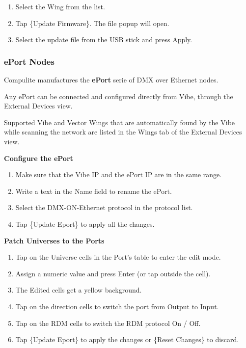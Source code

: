 \documentclass[
]{article}
\begin{document}
\begin{enumerate}
\def\labelenumi{\arabic{enumi}.}
\item
  Select the Wing from the list.
\item
  Tap \{Update Firmware\}. The file popup will open.
\item
  Select the update file from the USB stick and press Apply.
\end{enumerate}

\hypertarget{eport-nodes}{%
\subsubsection{ePort Nodes}\label{eport-nodes}}

Compulite manufactures the \textbf{ePort} serie of DMX over Ethernet nodes.

Any ePort can be connected and configured directly from Vibe, through the External Devices view.

Supported Vibe and Vector Wings that are automatically found by the Vibe while scanning the network are listed in the Wings tab of the External Devices view.

\textbf{Configure the ePort}

\begin{enumerate}
\def\labelenumi{\arabic{enumi}.}
\item
  Make sure that the Vibe IP and the ePort IP are in the same range.
\item
  Write a text in the Name field to rename the ePort.
\item
  Select the DMX-ON-Ethernet protocol in the protocol list.
\item
  Tap \{Update Eport\} to apply all the changes.
\end{enumerate}

\textbf{Patch Universes to the Ports}

\begin{enumerate}
\def\labelenumi{\arabic{enumi}.}
\item
  Tap on the Universe cells in the Port's table to enter the edit mode.
\item
  Assign a numeric value and press Enter (or tap outside the cell).
\item
  The Edited cells get a yellow background.
\item
  Tap on the direction cells to switch the port from Output to Input.
\item
  Tap on the RDM cells to switch the RDM protocol On / Off.
\item
  Tap \{Update Eport\} to apply the changes or \{Reset Changes\} to discard.
\end{enumerate}
\end{document}
